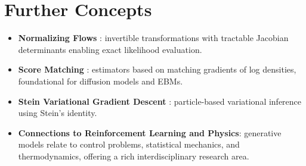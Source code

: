 \section{Further Concepts}
\begin{itemize}
    \item \textbf{Normalizing Flows} \cite{rezende2015}: invertible transformations with tractable Jacobian determinants enabling exact likelihood evaluation.
    \item \textbf{Score Matching} \cite{hyvarinen2005}: estimators based on matching gradients of log densities, foundational for diffusion models and EBMs.
    \item \textbf{Stein Variational Gradient Descent} \cite{liu2016}: particle-based variational inference using Stein's identity.
    \item \textbf{Connections to Reinforcement Learning and Physics}: generative models relate to control problems, statistical mechanics, and thermodynamics, offering a rich interdisciplinary research area.
\end{itemize}

